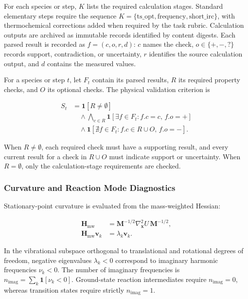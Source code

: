For each species or step, $K$ lists the required calculation stages. Standard elementary steps require the sequence $K=\{\text{ts\_opt}, \text{frequency}, \text{short\_irc}\}$, with thermochemical corrections added when required by the task rubric. Calculation outputs are archived as immutable records identified by content digests. Each parsed result is recorded as $f=(c,o,r,d)$: $c$ names the check, $o\in\{+,-,?\}$ records support, contradiction, or uncertainty, $r$ identifies the source calculation output, and $d$ contains the measured values.

For a species or step $t$, let $F_t$ contain its parsed results, $R$ its required property checks, and $O$ its optional checks. The physical validation criterion is

\begin{equation}\label{eq:methods-09}
\begin{aligned}
S_t&=\mathbf{1}[R\ne\emptyset]\\
&\quad{}\wedge\bigwedge_{c\in R}\mathbf{1}[\exists f\in F_t:f.c=c,\,f.o=+]\\
&\quad{}\wedge\mathbf{1}[\nexists f\in F_t:f.c\in R\cup O,\,f.o=-].
\end{aligned}
\end{equation}

When $R\ne\emptyset$, each required check must have a supporting result, and every current result for a check in $R\cup O$ must indicate support or uncertainty. When $R=\emptyset$, only the calculation-stage requirements are checked.

\subsubsection{Curvature and Reaction Mode Diagnostics}
Stationary-point curvature is evaluated from the mass-weighted Hessian:

\begin{equation}\label{eq:methods-10}
\begin{aligned}
\mathbf{H}_{\mathrm{mw}}&=\mathbf{M}^{-1/2}\nabla_{\mathbf{x}}^2 U\,\mathbf{M}^{-1/2},\\
\mathbf{H}_{\mathrm{mw}}\mathbf{v}_k&=\lambda_k\mathbf{v}_k.
\end{aligned}
\end{equation}

In the vibrational subspace orthogonal to translational and rotational degrees of freedom, negative eigenvalues $\lambda_k<0$ correspond to imaginary harmonic frequencies $\nu_k<0$. The number of imaginary frequencies is $n_{\mathrm{imag}}=\sum_k \mathbf{1}[\nu_k<0]$. Ground-state reaction intermediates require $n_{\mathrm{imag}}=0$, whereas transition states require strictly $n_{\mathrm{imag}}=1$.

